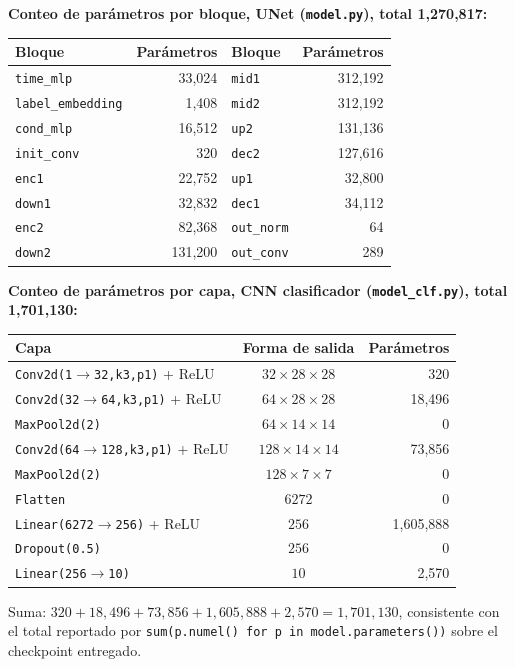 \documentclass[a4paper,10pt]{article}
\theoremstyle{definition}	\newtheorem*{df}{Definici\'on}
\theoremstyle{definition}	\newtheorem{tm}{Teorema}
\theoremstyle{definition}	\newtheorem*{prop}{Proposición}
\theoremstyle{plain}		\newtheorem*{lema}{Lema}
\theoremstyle{plain}		\newtheorem*{obs}{Observaci\'on}
\theoremstyle{remark}		\newtheorem*{dem}{Demostraci\'on}
\begin{document}
\noindent\textbf{Conteo de parámetros por bloque, UNet (\texttt{model.py}),
total 1{,}270{,}817:}
\begin{center}
\small
\begin{tabular}{@{}lr@{\hspace{2em}}lr@{}}
\toprule
Bloque & Parámetros & Bloque & Parámetros \\
\midrule
\texttt{time\_mlp}        & 33{,}024  & \texttt{mid1}      & 312{,}192 \\
\texttt{label\_embedding} & 1{,}408   & \texttt{mid2}      & 312{,}192 \\
\texttt{cond\_mlp}        & 16{,}512  & \texttt{up2}       & 131{,}136 \\
\texttt{init\_conv}       & 320       & \texttt{dec2}      & 127{,}616 \\
\texttt{enc1}             & 22{,}752  & \texttt{up1}       & 32{,}800  \\
\texttt{down1}            & 32{,}832  & \texttt{dec1}      & 34{,}112  \\
\texttt{enc2}             & 82{,}368  & \texttt{out\_norm} & 64        \\
\texttt{down2}            & 131{,}200 & \texttt{out\_conv} & 289       \\
\bottomrule
\end{tabular}
\end{center}

\noindent\textbf{Conteo de parámetros por capa, CNN clasificador
(\texttt{model\_clf.py}), total 1{,}701{,}130:}
\begin{center}
\small
\begin{tabular}{@{}lcr@{}}
\toprule
Capa & Forma de salida & Parámetros \\
\midrule
\texttt{Conv2d(1$\to$32,k3,p1)} + ReLU  & $32\times28\times28$ & 320 \\
\texttt{Conv2d(32$\to$64,k3,p1)} + ReLU & $64\times28\times28$ & 18{,}496 \\
\texttt{MaxPool2d(2)}                    & $64\times14\times14$ & 0 \\
\texttt{Conv2d(64$\to$128,k3,p1)} + ReLU & $128\times14\times14$ & 73{,}856 \\
\texttt{MaxPool2d(2)}                    & $128\times7\times7$ & 0 \\
\texttt{Flatten}                         & $6272$ & 0 \\
\texttt{Linear(6272$\to$256)} + ReLU     & $256$ & 1{,}605{,}888 \\
\texttt{Dropout(0.5)}                    & $256$ & 0 \\
\texttt{Linear(256$\to$10)}              & $10$ & 2{,}570 \\
\bottomrule
\end{tabular}
\end{center}
Suma: $320+18{,}496+73{,}856+1{,}605{,}888+2{,}570=1{,}701{,}130$,
consistente con el total reportado por \texttt{sum(p.numel() for p in
model.parameters())} sobre el checkpoint entregado.
\end{document}
